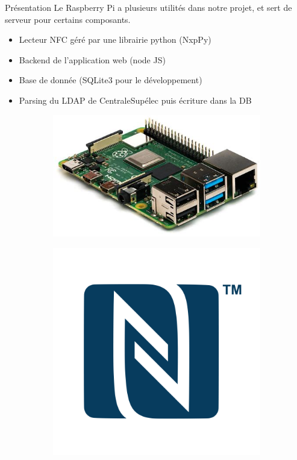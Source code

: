 \documentclass[aspectratio=169]{beamer}
\begin{document}
\begin{frame}{Présentation}
  Le Raspberry Pi a plusieurs utilités dans notre projet, et sert de serveur pour certains composants.
  \begin{itemize}
    \item Lecteur NFC géré par une librairie python (NxpPy)
    \item Backend de l'application web (node JS)
    \item Base de donnée (SQLite3 pour le développement)
    \item Parsing du LDAP de CentraleSupélec puis écriture dans la DB
  \end{itemize}

  \begin{figure}
    \begin{subfigure}{.2\textwidth}
      \centering
      \includegraphics[width=.8\linewidth]{../assets/raspi.jpeg}
    \end{subfigure}
    \begin{subfigure}{.2\textwidth}
      \centering
      \includegraphics[width=.8\linewidth]{../assets/nfc.png}

\end{subfigure}
\end{figure}
\end{frame}
\end{document}
